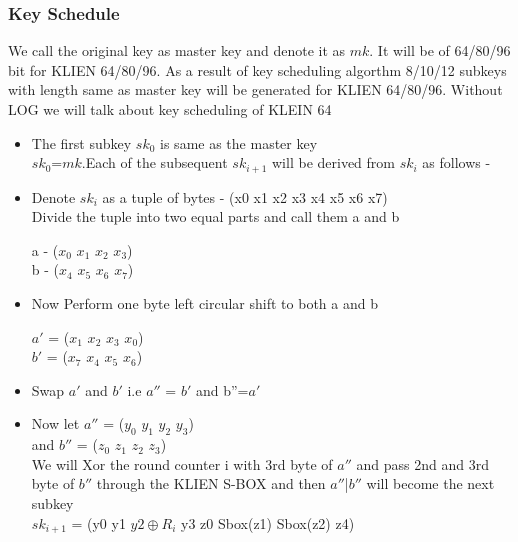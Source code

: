 \documentclass[preprint]{transcrypto}
\begin{document}
\subsubsection{Key Schedule}
We call the original key as master key and denote it as $mk$. It will be of 64/80/96 bit for  KLIEN 64/80/96. As a result of key scheduling algorthm 8/10/12  subkeys with length same as master key will be generated for KLIEN 64/80/96. Without LOG we will talk about key scheduling of KLEIN 64 \\

\begin{itemize}

\item The first subkey $sk_{0}$ is same as the master key \\
	$sk_{0}$=$mk$.Each of the subsequent $sk_{i+1}$ will be derived from $sk_{i}$ as follows - 

\item Denote $sk_{i}$ as a tuple of bytes - (x0 x1 x2 x3 x4 x5 x6 x7) \\
Divide the tuple into two equal parts and call them a and b 

a - ($ x_{0}$ $x_{1}$ $x_{2}$ $x_{3}$) \\
b - ($x_{4}$ $x_{5}$ $x_{6}$ $x_{7}$) 

\item Now Perform one byte left circular shift to both a and b

$a'$ = ($x_{1}$ $x_{2}$ $x_{3}$ $x_{0}$) \\
$b'$  = ($x_{7}$ $x_{4}$ $x_{5}$ $x_{6}$) \\

\item Swap $a'$ and $b'$  i.e $a''$ = $b'$  and b''=$a'$ \\

\item Now let $a''$ = ($y_{0}$ $y_{1}$ $y_{2}$ $y_{3}$) \\
and $b''$ = ($z_{0}$ $z_{1}$ $z_{2}$ $z_{3}$) \\

We will Xor the round counter i with 3rd byte of $a''$ and pass 2nd and 3rd byte of $b''$ through the KLIEN S-BOX and then $a''$|$b''$ will become the next subkey \\
$sk_{i+1}$ = (y0 y1 $ y2 \oplus R_i $ y3 z0 Sbox(z1) Sbox(z2) z4)
\end{itemize}
\end{document}
